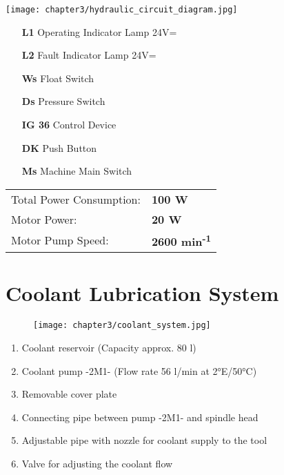 \begin{minipage}{0.65\textwidth}
    \texttt{[image: chapter3/hydraulic\_circuit\_diagram.jpg]}
\end{minipage}%
\begin{minipage}{0.35\textwidth}
    \begin{itemize}
        \item[\textbf{L1}] Operating Indicator Lamp 24V=
        \item[\textbf{L2}] Fault Indicator Lamp 24V=
        \item[\textbf{Ws}] Float Switch
        \item[\textbf{Ds}] Pressure Switch
        \item[\textbf{IG 36}] Control Device
        \item[\textbf{DK}] Push Button
        \item[\textbf{Ms}] Machine Main Switch
    \end{itemize}
\end{minipage}

\vspace{1cm}

\noindent
\begin{tabular}{ll}
    Total Power Consumption: & \textbf{100 W} \\
    Motor Power: & \textbf{20 W} \\
    Motor Pump Speed: & \textbf{2600 min\textsuperscript{-1}}
\end{tabular}

\section{Coolant Lubrication System}

\setcounter{section}{22}

\begin{figure}[h]
    \centering
    \texttt{[image: chapter3/coolant\_system.jpg]}
\end{figure}

\noindent
\begin{enumerate}
    \item Coolant reservoir (Capacity approx. 80 l)\footnotemark
    \item Coolant pump -2M1- (Flow rate 56 l/min at 2°E/50°C)\footnotemark
    \item Removable cover plate
    \item Connecting pipe between pump -2M1- and spindle head
    \item Adjustable pipe with nozzle for coolant supply to the tool\footnotemark
    \item Valve for adjusting the coolant flow
\end{enumerate}

